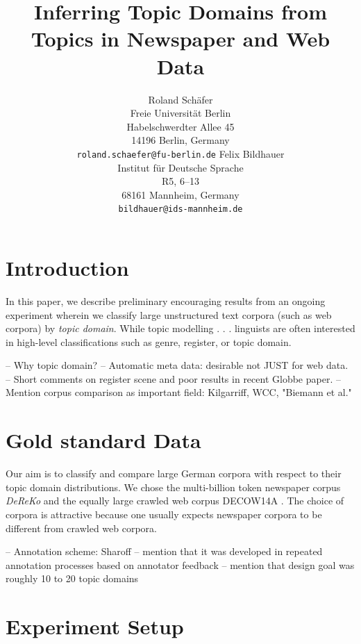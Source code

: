 \documentclass[11pt]{article}
\title{Inferring Topic Domains from Topics in Newspaper and Web Data}
\author{Roland Schäfer\\
	    Freie Universität Berlin\\
	    Habelschwerdter Allee 45\\
	    14196 Berlin, Germany\\
	    {\tt roland.schaefer@fu-berlin.de}
	  \And
	Felix Bildhauer\\
  	Institut für Deutsche Sprache\\
  	R5, 6--13\\
  	68161 Mannheim, Germany\\
  {\tt bildhauer@ids-mannheim.de}}
\date{}
\begin{document}
\maketitle

\begin{abstract}
\end{abstract}

\section{Introduction}
\label{sec:introduction}

In this paper, we describe preliminary encouraging results from an ongoing experiment wherein we classify large unstructured text corpora (such as web corpora) by \textit{topic domain}.
While topic modelling . . . linguists are often interested in high-level classifications such as genre, register, or topic domain.

-- Why topic domain?
-- Automatic meta data: desirable not JUST for web data.
-- Short comments on register scene and poor results in recent Globbe paper.
-- Mention corpus comparison as important field: Kilgarriff, WCC, "Biemann et al."

\section{Gold standard Data}
\label{sec:goldstandard}

Our aim is to classify and compare large German corpora with respect to their topic domain distributions.
We chose the multi-billion token newspaper corpus \textit{DeReKo} \cite{KupietzEa2010} and the equally large crawled web corpus DECOW14A \cite{SchaeferBildhauer2012a,Schaefer2015b}.
The choice of corpora is attractive because one usually expects newspaper corpora to be different from crawled web corpora.

-- Annotation scheme: Sharoff
-- mention that it was developed in repeated annotation processes based on annotator feedback
-- mention that design goal was roughly 10 to 20 topic domains

\section{Experiment Setup}
\label{sec:experiment}
\end{document}
